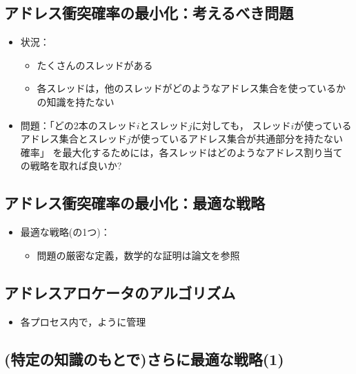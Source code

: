 \documentclass[25pt,papersize,landscape]{jsarticle}
\begin{document}
\subsection{アドレス衝突確率の最小化：考えるべき問題}

\begin{itemize}
\item 状況：
  \begin{itemize}
  \item たくさんのスレッドがある
  \item 各スレッドは，他のスレッドがどのようなアドレス集合を使っているかの知識を持たない
  \end{itemize}
\item 問題：「どの2本のスレッド$i$とスレッド$j$に対しても，
  スレッド$i$が使っているアドレス集合とスレッド$j$が使っているアドレス集合が共通部分を持たない確率」
  を最大化するためには，各スレッドはどのようなアドレス割り当ての戦略を取れば良いか?
\end{itemize}

\subsection{アドレス衝突確率の最小化：最適な戦略}

\begin{itemize}
\item 最適な戦略(の1つ)：
  \begin{itemize}
  \item 問題の厳密な定義，数学的な証明は論文を参照
  \end{itemize}
\end{itemize}


\subsection{アドレスアロケータのアルゴリズム}

\begin{itemize}
\item 各プロセス内で，ように管理
\end{itemize}

\subsection{(特定の知識のもとで)さらに最適な戦略(1)}
\end{document}
